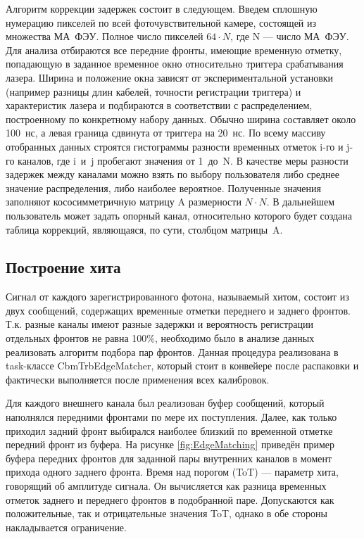 Алгоритм коррекции задержек состоит в следующем. Введем сплошную нумерацию пикселей по всей фоточувствительной камере, состоящей из множества МА~ФЭУ. Полное число пикселей $ 64 \cdot N $, где N --- число МА~ФЭУ. Для анализа отбираются все передние фронты, имеющие временную отметку, попадающую в заданное временное окно относительно триггера срабатывания лазера. Ширина и положение окна зависят от экспериментальной установки (например разницы длин кабелей, точности регистрации триггера) и характеристик лазера и подбираются в соответствии с распределением, построенному по конкретному набору данных. Обычно ширина составляет около 100~нс, а левая граница сдвинута от триггера на 20~нс. По всему массиву отобранных данных строятся гистограммы разности временных отметок i-го и j-го каналов, где i~и~j пробегают значения от 1~до~N. В качестве меры разности задержек между каналами можно взять по выбору пользователя либо среднее значение распределения, либо наиболее вероятное. Полученные значения заполняют кососимметричную матрицу A размерности $ N \cdot N $. В дальнейшем пользователь может задать опорный канал, относительно которого будет создана таблица коррекций, являющаяся, по сути, столбцом матрицы~A.

\subsection{Построение хита}

Сигнал от каждого зарегистрированного фотона, называемый хитом, состоит из двух сообщений, содержащих временные отметки переднего и заднего фронтов. Т.к. разные каналы имеют разные задержки и вероятность регистрации отдельных фронтов не равна 100\%, необходимо было в анализе данных реализовать алгоритм подбора пар фронтов. Данная процедура реализована в task-классе CbmTrbEdgeMatcher, который стоит в конвейере после распаковки и фактически выполняется после применения всех калибровок.

Для каждого внешнего канала был реализован буфер сообщений, который наполнялся передними фронтами по мере их поступления. Далее, как только приходил задний фронт выбирался наиболее близкий по временной отметке передний фронт из буфера. На рисунке \ref{fig:EdgeMatching} приведён пример буфера передних фронтов для заданной пары внутренних каналов в момент прихода одного заднего фронта. Время над порогом (ToT) --- параметр хита, говорящий об амплитуде сигнала. Он вычисляется как разница временных отметок заднего и переднего фронтов в подобранной паре. Допускаются как положительные, так и отрицательные значения ToT, однако в обе стороны накладывается ограничение.

